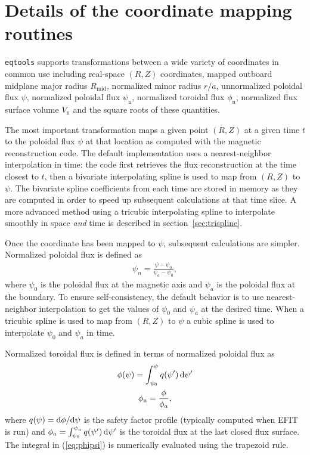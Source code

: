 \documentclass[12pt,floatfix,showpacs]{revtex4-1}
\newcommand{\diff}{\ensuremath\mathrm{d}}
\newcommand{\eqtools}{\texttt{eqtools}\xspace}
\begin{document}
\section{Details of the coordinate mapping routines}\label{sec:algo}
\eqtools supports transformations between a wide variety of coordinates in common use including real-space $(R, Z)$ coordinates, mapped outboard midplane major radius $R_{\text{mid}}$, normalized minor radius $r/a$, unnormalized poloidal flux $\psi$, normalized poloidal flux $\psi_{\text{n}}$, normalized toroidal flux $\phi_{\text{n}}$, normalized flux surface volume $V_{\text{n}}$ and the square roots of these quantities.

The most important transformation maps a given point $(R, Z)$ at a given time $t$ to the poloidal flux $\psi$ at that location as computed with the magnetic reconstruction code.
The default implementation uses a nearest-neighbor interpolation in time: the code first retrieves the flux reconstruction at the time closest to $t$, then a bivariate interpolating spline \cite{dierckxBook,scipy} is used to map from $(R, Z)$ to $\psi$.
The bivariate spline coefficients from each time are stored in memory as they are computed in order to speed up subsequent calculations at that time slice.
A more advanced method using a tricubic interpolating spline to interpolate smoothly in space \emph{and} time is described in section~\ref{sec:trispline}.

Once the coordinate has been mapped to $\psi$, subsequent calculations are simpler.
Normalized poloidal flux is defined as
\begin{gather}
	\psi_{n} = \frac{\psi - \psi_{0}}{\psi_{a} - \psi_{0}},
\end{gather}
where $\psi_{0}$ is the poloidal flux at the magnetic axis and $\psi_{a}$ is the poloidal flux at the boundary.
To ensure self-consistency, the default behavior is to use nearest-neighbor interpolation to get the values of $\psi_{0}$ and $\psi_{a}$ at the desired time.
When a tricubic spline is used to map from $(R, Z)$ to $\psi$ a cubic spline is used to interpolate $\psi_{0}$ and $\psi_{a}$ in time.

Normalized toroidal flux is defined in terms of normalized poloidal flux as
\begin{equation}
	\begin{gathered}
		\phi(\psi) = \int_{\psi_{0}}^{\psi} q(\psi')\,\diff\psi'\label{eq:phipsi}\\
		\phi_{\text{n}} = \frac{\phi}{\phi_{a}},
	\end{gathered}
\end{equation}
where $q(\psi) = \diff\phi/\diff\psi$ is the safety factor profile (typically computed when EFIT is run) and $\phi_{a}=\int_{\psi_{0}}^{\psi_{a}}q(\psi')\,\diff\psi'$ is the toroidal flux at the last closed flux surface.
The integral in (\ref{eq:phipsi}) is numerically evaluated using the trapezoid rule.
\end{document}
